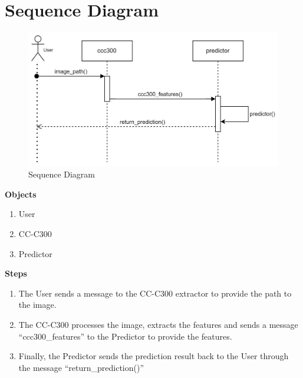 \section{Sequence Diagram}
\begin{figure}[H]
    \centering
    \includegraphics[width=120mm]{./img/sequenceDiagram.png}
    \caption{Sequence Diagram}
\end{figure}
\large{\textbf{Objects}}
\normalsize{
    \begin{enumerate}[noitemsep]
        \item User
        \item CC-C300
        \item Predictor
    \end{enumerate}
}
\large{\textbf{Steps}}
\normalsize{
    \begin{enumerate}[noitemsep]
        \item The User sends a message to the CC-C300 extractor to provide the path to the image.
        \item The CC-C300 processes the image, extracts the features and sends a message ``ccc300\_features'' to the Predictor to provide the features.
        \item Finally, the Predictor sends the prediction result back to the User through the message ``return\_prediction()''
    \end{enumerate}
}


